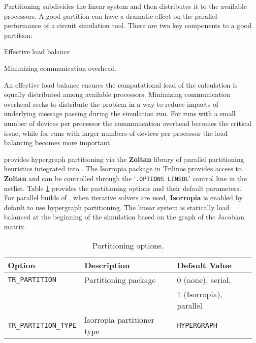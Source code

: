 Partitioning subdivides the linear system and 
then distributes it to the available processors.  A good partition can have a dramatic 
effect on the parallel performance of a circuit simulation tool.  
There are two key components to a good partition:

\begin{XyceItemize}
  \item Effective load balance
  \item Minimizing communication overhead.  
\end{XyceItemize}

An effective load balance ensures the computational load of the calculation is equally distributed among 
available processors. Minimizing communication overhead seeks to distribute the problem in a way to reduce 
impacts of underlying message passing during the simulation run. For runs with a small number of devices 
per processor the communication overhead becomes the critical issue, while for runs with larger numbers 
of devices per processor the load balancing becomes more important.  

\Xyce{} provides hypergraph partitioning via the \textbf{Zoltan} library of parallel 
partitioning heuristics integrated into \Xyce{}.  The Isorropia package in Trilinos provides access to \textbf{Zoltan} and 
can be controlled through the `\texttt{.OPTIONS LINSOL}' 
control line in the netlist. Table \ref{tab:partitioning:options} provides
the partitioning options and their default parameters. For parallel builds of 
\Xyce{}, when iterative solvers are used, \textbf{Isorropia} is enabled by default to use hypergraph partitioning. 
The linear system is statically load balanced at the beginning of the simulation based 
on the graph of the Jacobian matrix.  

\begin{table}[htp]
\caption[Partitioning options.]{Partitioning options.}
\label{tab:partitioning:options}
\begin{center}
\begin{tabular}{| p{3.5cm} | p{6cm} | p{4.5cm} |}
\hline
Option & Description & Default Value \\
\hline
{\tt TR\_PARTITION}        & Partitioning package & 0 (none), serial, \\
                           &                      & 1 (Isorropia), parallel \\
{\tt TR\_PARTITION\_TYPE}  & Isorropia partitioner type & \verb|HYPERGRAPH| \\
\hline
\end{tabular}
\end{center}
\end{table}

